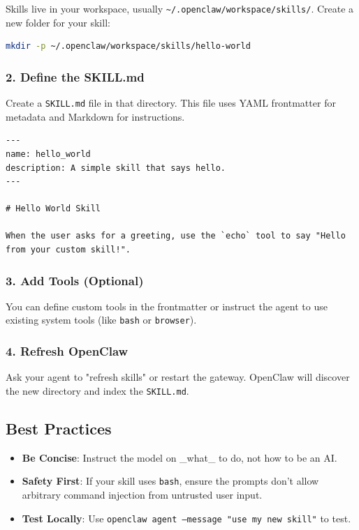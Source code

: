 Skills live in your workspace, usually \texttt{\textasciitilde{}/.openclaw/workspace/skills/}. Create a new folder for your skill:

\begin{lstlisting}[language=bash]
mkdir -p ~/.openclaw/workspace/skills/hello-world
\end{lstlisting}


\subsubsection{2. Define the SKILL.md}


Create a \texttt{SKILL.md} file in that directory. This file uses YAML frontmatter for metadata and Markdown for instructions.

\begin{lstlisting}
---
name: hello_world
description: A simple skill that says hello.
---

# Hello World Skill

When the user asks for a greeting, use the `echo` tool to say "Hello from your custom skill!".
\end{lstlisting}


\subsubsection{3. Add Tools (Optional)}


You can define custom tools in the frontmatter or instruct the agent to use existing system tools (like \texttt{bash} or \texttt{browser}).

\subsubsection{4. Refresh OpenClaw}


Ask your agent to "refresh skills" or restart the gateway. OpenClaw will discover the new directory and index the \texttt{SKILL.md}.

\subsection{Best Practices}


\begin{itemize}
  \item \textbf{Be Concise}: Instruct the model on \_what\_ to do, not how to be an AI.
  \item \textbf{Safety First}: If your skill uses \texttt{bash}, ensure the prompts don't allow arbitrary command injection from untrusted user input.
  \item \textbf{Test Locally}: Use \texttt{openclaw agent --message "use my new skill"} to test.
\end{itemize}


